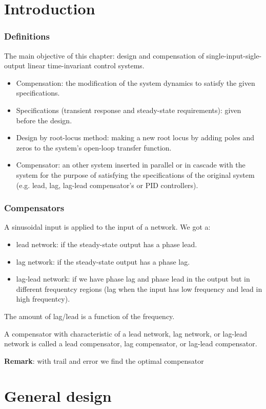 \section{Introduction}

\begin{frame}
	\frametitle{Definitions}
		The main objective of this chapter: design and compensation of single-input-sigle-output linear time-invariant control systems.
		\begin{itemize}
			\item Compensation: the modification of the system dynamics to satisfy the given specifications.
			\item Specifications (transient response and steady-state requirements): given before the design.
			\item Design by root-locus method: making a new root locus by adding poles and zeros to the system's open-loop transfer function.
			\item Compensator: an other system inserted in parallel or in cascade with the system for the purpose of satisfying the specifications of the original system (e.g. lead, lag, lag-lead compensator's or PID controllers).
		\end{itemize}
\end{frame}

\begin{frame}
	\frametitle{Compensators}
	A sinusoidal input is applied to the input of a network. We got a:
	\begin{itemize}
		\item lead network: if the steady-state output has a phase lead.
		\item lag network: if the steady-state output has a phase lag.
		\item lag-lead network: if we have phase lag and phase lead in the output but in different frequentcy regions (lag when the input has low frequency and lead in high frequentcy). 
	\end{itemize}
	The amount of lag/lead is a function of the frequency. \vspace{4mm}
	
	A compensator with characteristic of a lead network, lag network, or lag-lead network is called a lead compensator, lag compensator, or lag-lead compensator. 
	
	\textbf{Remark}: with trail and error we find the optimal compensator
\end{frame}

\section{General design}

